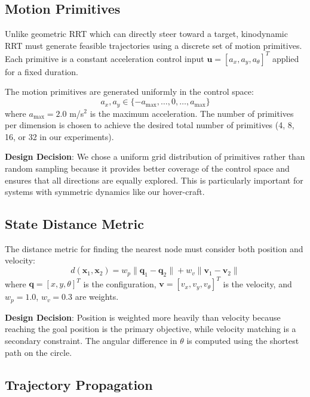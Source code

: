\documentclass[11pt]{article}
\begin{document}
\subsection{Motion Primitives}

Unlike geometric RRT which can directly steer toward a target, kinodynamic RRT must generate feasible trajectories using a discrete set of motion primitives. Each primitive is a constant acceleration control input $\mathbf{u} = [a_x, a_y, a_\theta]^T$ applied for a fixed duration.

The motion primitives are generated uniformly in the control space:
\begin{equation}
a_x, a_y \in \{-a_{\max}, \ldots, 0, \ldots, a_{\max}\}
\end{equation}
where $a_{\max} = 2.0$ m/s$^2$ is the maximum acceleration. The number of primitives per dimension is chosen to achieve the desired total number of primitives (4, 8, 16, or 32 in our experiments).

\textbf{Design Decision}: We chose a uniform grid distribution of primitives rather than random sampling because it provides better coverage of the control space and ensures that all directions are equally explored. This is particularly important for systems with symmetric dynamics like our hover-craft.

\subsection{State Distance Metric}

The distance metric for finding the nearest node must consider both position and velocity:
\begin{equation}
d(\mathbf{x}_1, \mathbf{x}_2) = w_p \|\mathbf{q}_1 - \mathbf{q}_2\| + w_v \|\mathbf{v}_1 - \mathbf{v}_2\|
\end{equation}
where $\mathbf{q} = [x, y, \theta]^T$ is the configuration, $\mathbf{v} = [v_x, v_y, v_\theta]^T$ is the velocity, and $w_p = 1.0$, $w_v = 0.3$ are weights.

\textbf{Design Decision}: Position is weighted more heavily than velocity because reaching the goal position is the primary objective, while velocity matching is a secondary constraint. The angular difference in $\theta$ is computed using the shortest path on the circle.

\subsection{Trajectory Propagation}
\end{document}

